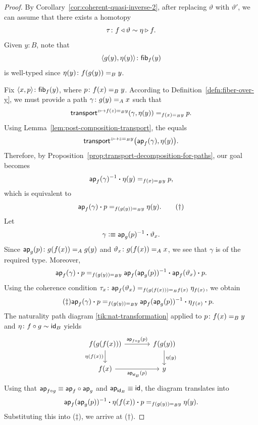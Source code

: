 \begin{proof}
    By Corollary~\ref{cor:coherent-quasi-inverse-2}, after replacing $\vartheta$ with $\vartheta'$, we can assume that there exists a homotopy
    \[
        \tau\colon f\lwct\vartheta\sim\eta\rwct f.
    \]
    Given $y\colon B$, note that
    \[
        \dep{g(y),\eta(y)}\colon\fun{fib}_f(y)
    \]
    is well-typed since $\eta(y)\colon f(g(y))\eq By$.

    Fix $\dep{x,p}\colon\fun{fib}_f(y)$, where $p\colon f(x)\eq By$. According to Definition~\ref{defn:fiber-over-y}, we must provide a path $\gamma\colon g(y)\eq Ax$ such that
    \[
        \mathsf{transport}^{z\mapsto f(z)\mathrel{=_{B}}y}(\gamma,\eta(y))\mathrel{=_{f(x)\mathrel{=_{B}}y}}p.
    \]
    Using Lemma~\ref{lem:post-composition-transport}, the \lhs equals
    \[
        \mathsf{transport}^{z\mapsto z\mathrel{=_{B}}y}\bigl(\mathsf{ap}_f(\gamma),\eta(y)\bigr).
    \]
    Therefore, by Proposition~\ref{prop:transport-decomposition-for-paths}, our goal becomes
    \[
        \mathsf{ap}_f(\gamma)^{-1}\mathbin{\boldsymbol{\cdot}}\eta(y)\mathrel{=_{f(x)\mathrel{=_{B}}y}}p,
    \]
    which is equivalent to
    \[
        \mathsf{ap}_f(\gamma)\mathbin{\boldsymbol{\cdot}} p\mathrel{=_{f(g(y))\mathrel{=_{B}}y}}\eta(y).\tag{$\dag$}
    \]
    Let
    \[
        \gamma\mathrel{\vcentcolon}\equiv\mathsf{ap}_g(p)^{-1}\mathbin{\boldsymbol{\cdot}}\vartheta_x.
    \]
    Since $\fun{ap}_g(p)\colon g(f(x))\eq Ag(y)$ and $\vartheta_x\colon g(f(x))\eq Ax$, we see that $\gamma$ is of the required type. Moreover,
    \[
        \mathsf{ap}_f(\gamma)\mathbin{\boldsymbol{\cdot}} p
            \mathrel{=_{f(g(y))\mathrel{=_{B}}y}}
                \mathsf{ap}_f(\mathsf{ap}_g(p))^{-1}
                \mathbin{\boldsymbol{\cdot}}\mathsf{ap}_f(\vartheta_x)
                \mathbin{\boldsymbol{\cdot}} p.
    \]
    Using the coherence condition $\tau_x\colon\fun{ap}_f(\vartheta_x)
            \eq{f(g(f(x)))\eq Bf(x)}\eta_{f(x)}$, we obtain
    \[\tag{$\ddag$}
        \mathsf{ap}_f(\gamma)\mathbin{\boldsymbol{\cdot}} p
        \mathrel{=_{f(g(y))\mathrel{=_{B}}y}}
        \mathsf{ap}_f(\mathsf{ap}_g(p))^{-1}\mathbin{\boldsymbol{\cdot}}\eta_{f(x)}\mathbin{\boldsymbol{\cdot}} p.
    \]
    The naturality path diagram \eqref{tik:nat-transformation} applied to $p\colon f(x)\eq By$ and $\eta\colon f\circ g\sim\id_B$ yields
    \[
        \begin{tikzcd}[column sep=large]
            f(g(f(x)))
                    \arrow[r,"\fun{ap}_{f\circ g}(p)"]
                    \arrow[d,"\eta(f(x))"']
                &f(g(y))
                    \arrow[d,"\eta(y)"]\\
            f(x)
                    \arrow[r,"\fun{ap}_{\id_B}(p)"']
                &y
        \end{tikzcd}
    \]
    Using that $\mathsf{ap}_{f\circ g}\equiv\mathsf{ap}_f\circ\mathsf{ap}_g$ and $\mathsf{ap}_{\mathsf{id}_B}\equiv\mathsf{id}$, the diagram translates into
    \[
        \mathsf{ap}_f(\mathsf{ap}_g(p))^{-1}\mathbin{\boldsymbol{\cdot}}\eta(f(x))\mathbin{\boldsymbol{\cdot}} p
        \mathrel{=_{f(g(y))\mathrel{=_{B}}y}}
        \eta(y).
    \]
    Substituting this into ($\ddag$), we arrive at ($\dag$).
\end{proof}

